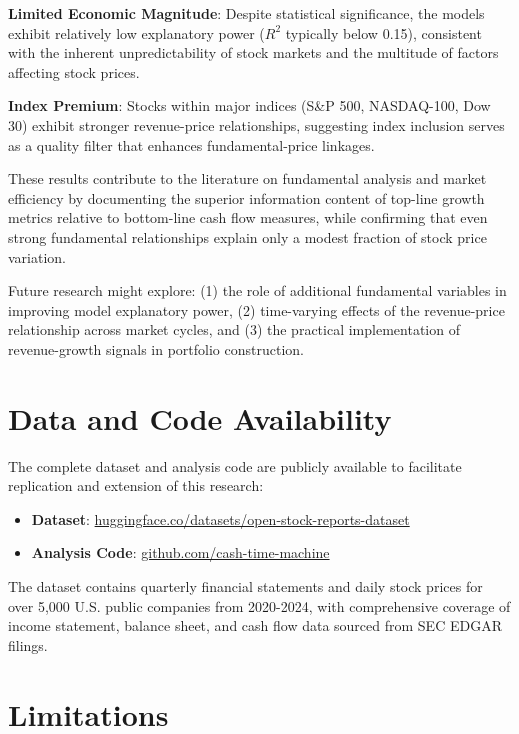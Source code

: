 \documentclass[11pt]{article}
\begin{document}
\textbf{Limited Economic Magnitude}: Despite statistical significance, the models exhibit relatively low explanatory power ($R^2$ typically below 0.15), consistent with the inherent unpredictability of stock markets and the multitude of factors affecting stock prices.

\textbf{Index Premium}: Stocks within major indices (S\&P 500, NASDAQ-100, Dow 30) exhibit stronger revenue-price relationships, suggesting index inclusion serves as a quality filter that enhances fundamental-price linkages.

These results contribute to the literature on fundamental analysis and market efficiency by documenting the superior information content of top-line growth metrics relative to bottom-line cash flow measures, while confirming that even strong fundamental relationships explain only a modest fraction of stock price variation.

Future research might explore: (1) the role of additional fundamental variables in improving model explanatory power, (2) time-varying effects of the revenue-price relationship across market cycles, and (3) the practical implementation of revenue-growth signals in portfolio construction.

\section*{Data and Code Availability}

The complete dataset and analysis code are publicly available to facilitate replication and extension of this research:

\begin{itemize}
\item \textbf{Dataset}: \href{https://huggingface.co/datasets/almogtavor/open-stock-reports-dataset}{huggingface.co/datasets/open-stock-reports-dataset}
\item \textbf{Analysis Code}: \href{https://github.com/almogtavor/cash-time-machine}{github.com/cash-time-machine}
\end{itemize}

The dataset contains quarterly financial statements and daily stock prices for over 5,000 U.S. public companies from 2020-2024, with comprehensive coverage of income statement, balance sheet, and cash flow data sourced from SEC EDGAR filings.

\section*{Limitations}
\end{document}
